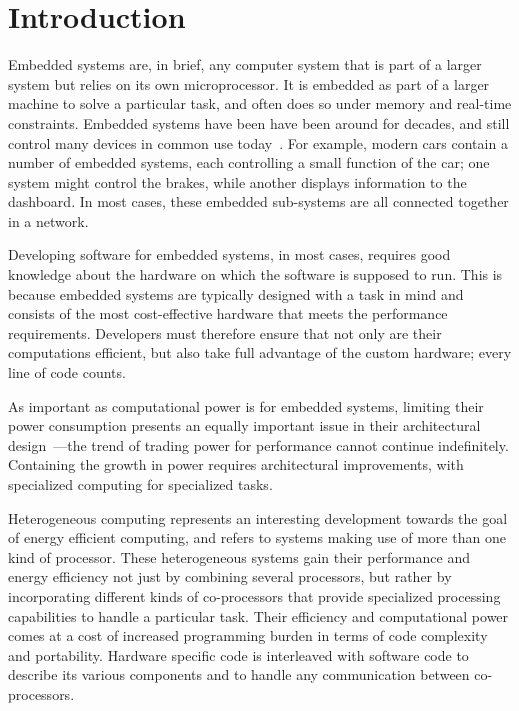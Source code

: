 \documentclass[../paper.tex]{subfiles}
\begin{document}
\chapter{Introduction}
\label{intro}

Embedded systems are, in brief, any computer system that is part of a larger system but relies on its own microprocessor. It is embedded as part of a larger machine to solve a particular task, and often does so under memory and real-time constraints. Embedded systems have been have been around for decades, and still control many devices in common use today~\cite{barr2006}. For example, modern cars contain a number of embedded systems, each controlling a small function of the car; one system might control the brakes, while another displays information to the dashboard. In most cases, these embedded sub-systems are all connected together in a network. 

Developing software for embedded systems, in most cases, requires good knowledge about the hardware on which the software is supposed to run. This is because embedded systems are typically designed with a task in mind and consists of the most cost-effective hardware that meets the performance requirements. Developers must therefore ensure that not only are their computations efficient, but also take full advantage of the custom hardware; every line of code counts.

As important as computational power is for embedded systems, limiting their power consumption presents an equally important issue in their architectural design~\cite{mudge2001}---the trend of trading power for performance cannot continue indefinitely. Containing the growth in power requires architectural improvements, with specialized computing for specialized tasks.

Heterogeneous computing represents an interesting development towards the goal of energy efficient computing, and refers to systems making use of more than one kind of processor. These heterogeneous systems gain their performance and energy efficiency not just by combining several processors, but rather by incorporating different kinds of co-processors that provide specialized processing capabilities to handle a particular task. Their efficiency and computational power comes at a cost of increased programming burden in terms of code complexity and portability. Hardware specific code is interleaved with software code to describe its various components and to handle any communication between co-processors.
\end{document}
